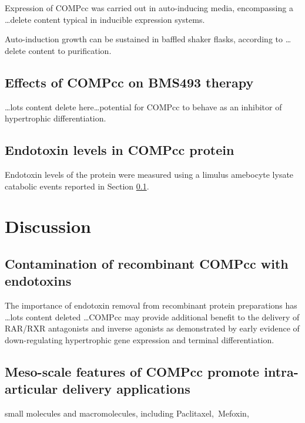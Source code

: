 \begin{refsection}
\label{sec:comp_biosynthesis_results}
Expression of COMPcc was carried out in auto-inducing media, encompassing a
\ldots delete content typical in inducible expression systems.

Auto-induction growth can be sustained in baffled shaker flasks, according to
\ldots delete content to purification.

\subsection{Effects of COMPcc on BMS493 therapy}
\label{sec:bms493_results}

\ldots lots content delete here\ldots potential for COMPcc to behave as an
inhibitor of hypertrophic differentiation.

\subsection{Endotoxin levels in COMPcc protein}
\label{sec:endotoxins}

Endotoxin levels of the protein were measured using a limulus amebocyte lysate
catabolic events reported in Section \ref{sec:bms493_results}.

\section{Discussion}
\subsection{Contamination of recombinant COMPcc with endotoxins}
The importance of endotoxin removal from recombinant protein preparations has
\ldots lots content deleted \ldots COMPcc may provide additional benefit to the
delivery of RAR/RXR antagonists and inverse agonists as demonstrated by early
evidence of down-regulating hypertrophic gene expression and terminal
differentiation.

\subsection{Meso-scale features of COMPcc promote intra-articular delivery
applications}
\label{sec:invivo_fate}
small molecules and macromolecules, including Paclitaxel,\ Mefoxin,


\end{refsection}
